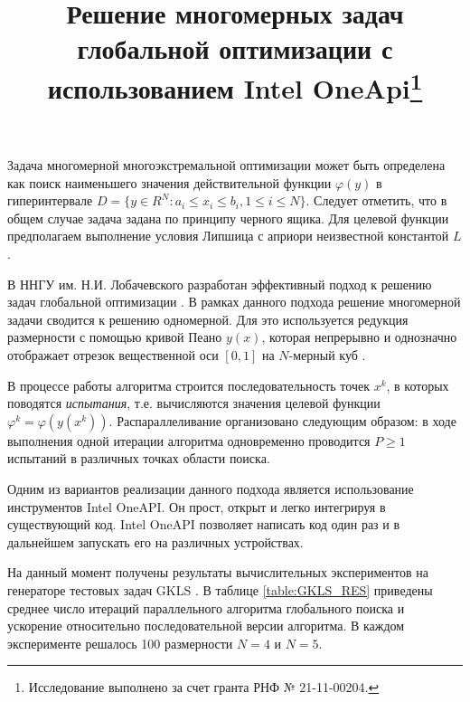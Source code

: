 \documentclass[11pt, oneside, a4paper]{article}
\begin{document}

\title{Решение многомерных задач глобальной оптимизации с использованием Intel OneApi\footnote{Исследование выполнено за счет гранта РНФ № 21-11-00204.}}



Задача многомерной многоэкстремальной оптимизации может быть определена как поиск наименьшего значения действительной функции \(\varphi(y)\)  в гиперинтервале \(D=\{y\in R^N:a_i\leqslant x_i\leqslant{b_i}, 1\leqslant{i}\leqslant{N}\}\). 
Следует отметить, что в общем случае задача задана по принципу черного ящика. Для целевой функции предполагаем выполнение условия Липшица с априори неизвестной константой \(L\).

В ННГУ им. Н.И. Лобачевского разработан эффективный подход к решению задач глобальной оптимизации \cite{Strongin2013}. В рамках данного подхода решение многомерной задачи сводится к решению одномерной. Для это используется редукция размерности с помощью кривой Пеано $y(x)$, которая непрерывно и однозначно отображает отрезок вещественной оси \([0,1]\) на  \(N\)-мерный куб \cite{Sergeyev2013}.


В процессе работы алгоритма строится последовательность точек \(x^k\), в которых поводятся \textit{испытания}, т.е. вычисляются значения целевой функции \(\varphi^k=\varphi(y(x^k))\).  Распараллеливание организовано следующим образом: в ходе выполнения одной итерации алгоритма одновременно проводится \(P \geq 1\) испытаний в различных точках области поиска.

Одним из вариантов реализации данного подхода является использование инструментов Intel OneAPI. Он прост, открыт и легко интегрируя в существующий код. Intel OneAPI позволяет написать код один раз и в дальнейшем запускать его на различных устройствах. 


На данный момент получены результаты вычислительных экспериментов на генераторе тестовых задач GKLS \cite{GKLS}. В таблице \ref{table:GKLS_RES} приведены среднее число итераций параллельного алгоритма глобального поиска и ускорение относительно последовательной версии алгоритма. В каждом эксперименте решалось 100 размерности $N=4$ и $N=5$.
\end{document}
